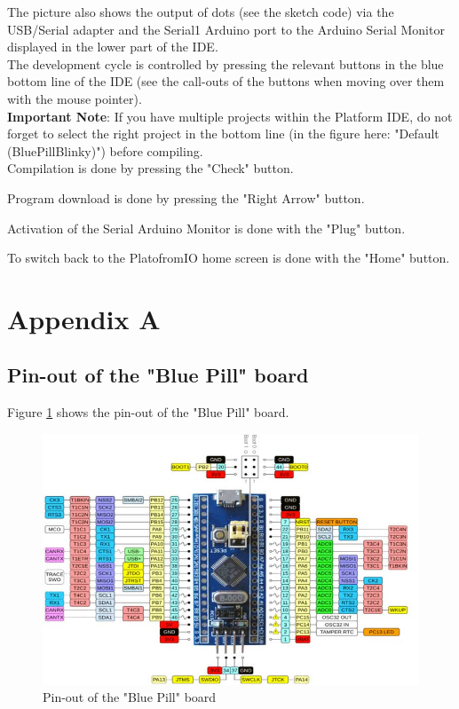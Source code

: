 \documentclass[11pt, oneside]{scrartcl}   	%
\begin{document}
The picture also shows the output of dots (see the sketch code) via the USB/Serial adapter and the Serial1 Arduino port
to the Arduino Serial Monitor displayed in the lower part of the IDE.\\

The development cycle is controlled by pressing the relevant buttons in the blue bottom line of the IDE (see the call-outs of the buttons when moving over them with the mouse pointer).\\

\textbf{Important Note}: If you have multiple projects within the Platform IDE, do not forget to select the right project in the bottom line (in the figure here:
"Default (BluePillBlinky)") before compiling.\\

Compilation is done by pressing the "Check" button.

Program download is done by pressing the "Right Arrow" button.

Activation of the Serial Arduino Monitor is done with the "Plug" button.

To switch back to the PlatofromIO home screen is done with the "Home" button. 

\newpage
\appendix
\section{Appendix A}
\subsection{Pin-out of the "Blue Pill" board}
Figure \ref{fig:BluePillPinout} shows the pin-out of the "Blue Pill" board.
\begin{figure}[htbp]
	\centering
	\includegraphics[width=1.0\linewidth]{Figures/STM32-Blue-Pill-Development-Board-Pinout.jpg}
	\caption{Pin-out of the "Blue Pill" board}
	\label{fig:BluePillPinout}
\end{figure}
\end{document}
